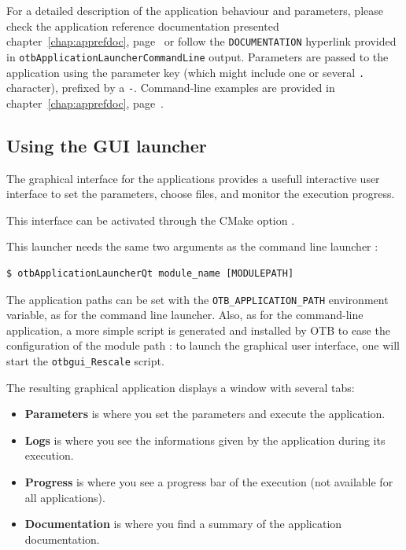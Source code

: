For a detailed description of the application behaviour and
parameters, please check the application reference documentation presented
chapter~\ref{chap:apprefdoc}, page~\pageref{chap:apprefdoc} or
follow the \verb?DOCUMENTATION? hyperlink provided in
\verb?otbApplicationLauncherCommandLine? output. Parameters are passed
to the application using the parameter key (which might include one or
several \verb?.? character), prefixed by a \verb?-?. Command-line
examples are provided in chapter~\ref{chap:apprefdoc},
page~\pageref{chap:apprefdoc}.


\subsection{Using the GUI launcher}

The graphical interface for the applications provides a usefull interactive user interface
to set the parameters, choose files, and monitor the execution progress.

This interface can be activated through the CMake option .

This launcher needs the same two arguments as the command line launcher :
\begin{verbatim}
$ otbApplicationLauncherQt module_name [MODULEPATH]
\end{verbatim}

The application paths can be set with the \verb?OTB_APPLICATION_PATH? environment variable,
as for the command line launcher.
Also, as for the command-line application, a more simple script is generated and installed by OTB
to ease the configuration of the module path : to launch the  graphical user interface,
one will start the \verb?otbgui_Rescale? script.

The resulting graphical application displays a window with several tabs:
\begin{itemize}
\item \textbf{Parameters} is where you set the parameters and
execute the application.
\item \textbf{Logs} is where you see the informations given by
the application during its execution.
\item \textbf{Progress} is where you see a progress bar of the
execution (not available for all applications).
\item \textbf{Documentation} is where you find a summary of the
application documentation.
\end{itemize}

